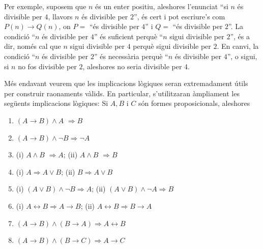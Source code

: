 Per exemple, suposem que $n$ és un enter positiu, aleshores l'enunciat
\enquote{si $n$ és divisible per $4$, llavors $n$ és divisible per $2$},
és cert i pot escriure's com $P(n)\longrightarrow Q(n)$, on $P=$ \enquote{és
divisible per $4$} i $Q=$ \enquote{és divisible per $2$}. La condició \enquote{$n$
és divisible per $4$} és suficient perquè \enquote{$n$ sigui divisible
per $2$}, és a dir, només cal que $n$ sigui divisible per $4$ perquè sigui divisible per $2$. En canvi, la condició \enquote{$n$ és
divisible per $2$} és necessària perquè \enquote{$n$ és divisible
per $4$}, o sigui, si $n$ no fos divisible per $2$, aleshores no seria
divisible per 4.

Més endavant veurem que les implicacions lògiques seran
extremadament útils per construir raonaments vàlids. En particular,
s'utilitzaran àmpliament les següents implicacions lògiques: Si $A,B$ i $C$ són formes proposicionals, aleshores

\begin{enumerate}
\item $(A\longrightarrow B)\wedge A$ $\Longrightarrow B$

\item $(A\longrightarrow B)\wedge\lnot B\Longrightarrow\lnot A$

\item (i) $A\wedge B$ $\Longrightarrow A$; (ii) $A\wedge B$ $\Longrightarrow
B$

\item (i) $A\Longrightarrow A\vee B$; (ii) $B\Longrightarrow A\vee B$

\item (i) $\left( A\vee B\right) \wedge\lnot B\Longrightarrow A$; (ii) $\left( A\vee B\right) \wedge\lnot A\Longrightarrow B$

\item (i) $A\longleftrightarrow B\Longrightarrow A\longrightarrow B$; (ii) $A\longleftrightarrow B\Longrightarrow B\longrightarrow A$

\item $\left( A\longrightarrow B\right) \wedge\left( B\longrightarrow
A\right) \Longrightarrow A\longleftrightarrow B$

\item $\left( A\longrightarrow B\right) \wedge\left( B\longrightarrow
C\right) \Longrightarrow A\longrightarrow C$
\end{enumerate}

